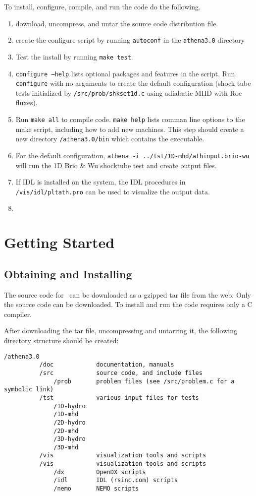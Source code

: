 To install, configure, compile, and run the code do the following.
\begin{enumerate}
\item download, uncompress, and untar the source code distribution file.
\item create the configure script by running {\tt autoconf} in the
{\tt athena3.0} directory
\item Test the install by running {\tt make test}.
\item {\tt configure --help} lists optional packages and features in the
script.  Run {\tt configure} with no arguments to create the default
configuration (shock tube tests initialized by {\tt /src/prob/shkset1d.c}
using adiabatic MHD with Roe fluxes).
\item Run {\tt make all} to compile code.  {\tt make help} lists
comman line options to the make script, including how to add new machines.
This step should create a new directory {\tt /athena3.0/bin} which contains
the executable.
\item For the default configuration, {\tt athena -i ../tst/1D-mhd/athinput.brio-wu} will run the 1D Brio \& Wu shocktube test and create output files.
\item If IDL is installed on the system, the IDL procedures in {\tt /vis/idl/pltath.pro} can be used to visualize the output data.
\item
\end{enumerate}

\section{Getting Started}

\subsection{Obtaining and Installing \ath}

The source code for \ath\ can be downloaded as a gzipped tar file from the
web.  Only the source code can be downloaded.  To install and run the code
requires only a C compiler.

After downloading the tar file, uncompressing and untarring it,
the following directory structure should be created:

\footnotesize
\begin{verbatim}
/athena3.0
          /doc            documentation, manuals
          /src            source code, and include files
              /prob       problem files (see /src/problem.c for a symbolic link)
          /tst            various input files for tests
              /1D-hydro
              /1D-mhd
              /2D-hydro
              /2D-mhd
              /3D-hydro
              /3D-mhd
          /vis            visualization tools and scripts
          /vis            visualization tools and scripts
              /dx         OpenDX scripts
              /idl        IDL (rsinc.com) scripts
              /nemo       NEMO scripts
\end{verbatim}
\normalsize

